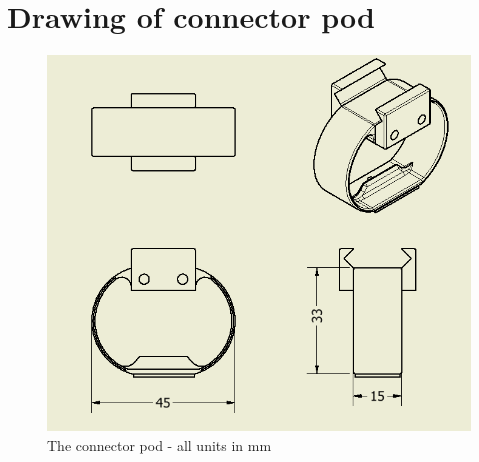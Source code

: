 \section{Drawing of connector pod}
\begin{figure}[H]
	\centering
	\includegraphics[width=1\textwidth]{imgs/app3_connectorpod_drawing}
	\caption{The connector pod - all units in \si{\milli\meter}}
\end{figure}
